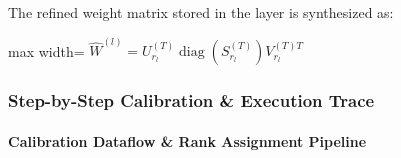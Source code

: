 The refined weight matrix stored in the layer is synthesized as:

\begin{center}
\begin{adjustbox}{max width=\columnwidth}
$\displaystyle
\hat{W}^{(l)} = U_{r_l}^{(T)} \operatorname{diag}(S_{r_l}^{(T)}) V_{r_l}^{(T)T}
$
\end{adjustbox}
\end{center}


\subsubsection*{Step-by-Step Calibration \& Execution Trace}

\paragraph{Calibration Dataflow \& Rank Assignment Pipeline}

